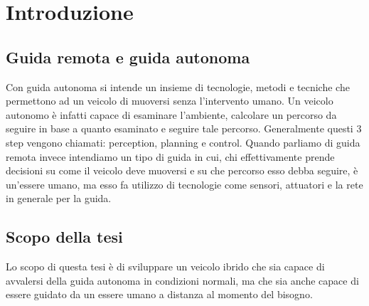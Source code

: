 \section{Introduzione}
\subsection{Guida remota e guida autonoma}
Con guida autonoma si intende un insieme di tecnologie, metodi e tecniche che permettono ad un veicolo di muoversi senza l'intervento umano. Un veicolo autonomo è infatti capace di esaminare l'ambiente, calcolare un percorso da seguire in base a quanto esaminato e seguire tale percorso. Generalmente questi 3 step vengono chiamati: perception, planning e control.
Quando parliamo di guida remota invece intendiamo un tipo di guida in cui, chi effettivamente prende decisioni su come il veicolo deve muoversi e su che percorso esso debba seguire, è un'essere umano, ma esso fa utilizzo di tecnologie come sensori, attuatori e la rete in generale per la guida.  
\subsection{Scopo della tesi}
Lo scopo di questa tesi è di sviluppare un veicolo ibrido che sia capace di avvalersi della guida autonoma in condizioni normali, ma che sia anche capace di essere guidato da un essere umano a distanza al momento del bisogno. 

